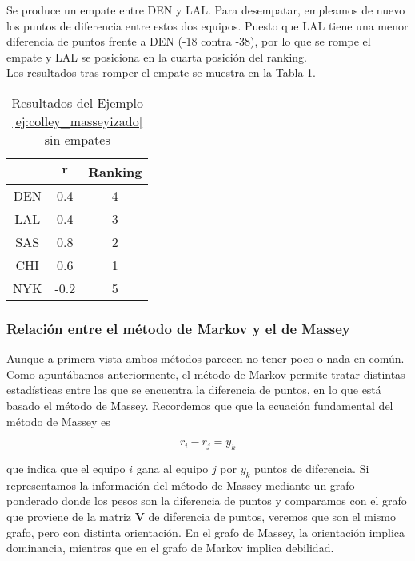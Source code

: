 \begin{ejemplo}
Se produce un empate entre DEN y LAL. Para desempatar, empleamos de nuevo los puntos de diferencia entre estos dos equipos. Puesto que LAL tiene una menor diferencia de puntos frente a DEN (-18 contra -38), por lo que se rompe el empate y LAL se posiciona en la cuarta posición del ranking.\\

Los resultados tras romper el empate se muestra en la Tabla \ref{tbl:colley_masseyizado_sin_empates}.


\begin{table}[h]
\centering
\caption{Resultados del Ejemplo \ref{ej:colley_masseyizado} sin empates}
\label{tbl:colley_masseyizado_sin_empates}
\begin{tabular}{@{}ccc@{}}
\cmidrule(l){2-3}
    & $\mathbf{r}$ & Ranking \\ \midrule
DEN &  0.4      & 4       \\
LAL &  0.4      & 3       \\
SAS &  0.8      & 2       \\
CHI &  0.6      & 1       \\
NYK & -0.2      & 5       \\ \bottomrule
\end{tabular}
\end{table}
\end{ejemplo}

\subsubsection{Relación entre el método de Markov y el de Massey}

Aunque a primera vista ambos métodos parecen no tener poco o nada en común. Como apuntábamos anteriormente, el método de Markov permite tratar distintas estadísticas entre las que se encuentra la diferencia de puntos, en lo que está basado el método de Massey. Recordemos que que la ecuación fundamental del método de Massey es

\[ r_i - r_j = y_k \]

que indica que el equipo $i$ gana al equipo $j$ por $y_k$ puntos de diferencia. Si representamos la información del método de Massey mediante un grafo ponderado donde los pesos son la diferencia de puntos y comparamos con el grafo que proviene de la matriz $\mathbf{V}$ de diferencia de puntos, veremos que son el mismo grafo, pero con distinta orientación. En el grafo de Massey, la orientación implica dominancia, mientras que en el grafo de Markov implica debilidad.

